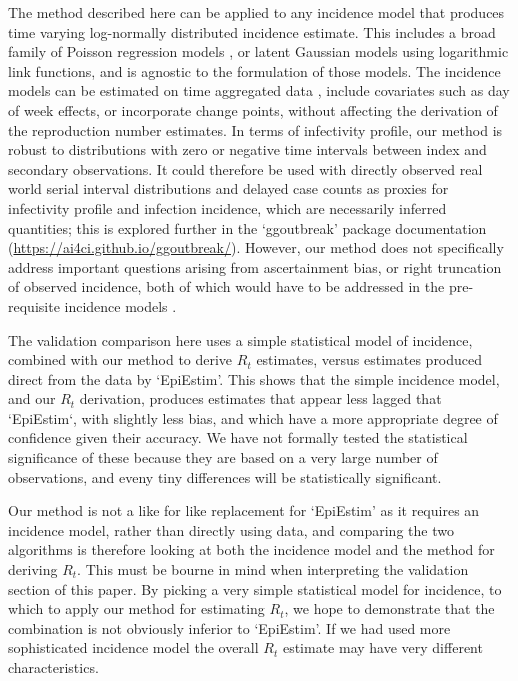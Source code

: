 \documentclass[10pt,letterpaper]{article}
\begin{document}
The method described here can be applied to any incidence model that produces time varying log-normally distributed incidence estimate. This includes a broad family of Poisson regression models \cite{nelder1972,loader1999,hastie2017}, or latent Gaussian models \cite{rue2009} using logarithmic link functions, and is agnostic to the formulation of those models. The incidence models can be estimated on time aggregated data \cite{nash2023}, include covariates such as day of week effects, or incorporate change points, without affecting the derivation of the reproduction number estimates. In terms of infectivity profile, our method is robust to distributions with zero or negative time intervals between index and secondary observations. It could therefore be used with directly observed real world serial interval distributions \cite{park2021} and delayed case counts as proxies for infectivity profile and infection incidence, which are necessarily inferred quantities; this is explored further in the `ggoutbreak' package documentation (\url{https://ai4ci.github.io/ggoutbreak/}). However, our method does not specifically address important questions arising from ascertainment bias, or right truncation of observed incidence, both of which would have to be addressed in the pre-requisite incidence models \cite{abbott2020,abbott2024}.

The validation comparison here uses a simple statistical model of incidence, combined with our method to derive $R_t$ estimates, versus estimates produced direct from the data by `EpiEstim'. This shows that the simple incidence model, and our $R_t$ derivation, produces estimates that appear less lagged that `EpiEstim`, with slightly less bias, and which have a more appropriate degree of confidence given their accuracy. We have not formally tested the statistical significance of these because they are based on a very large number of observations, and eveny tiny differences will be statistically significant.

Our method is not a like for like replacement for `EpiEstim' as it requires an incidence model, rather than directly using data, and comparing the two algorithms is therefore looking at both the incidence model and the method for deriving $R_t$. This must be bourne in mind when interpreting the validation section of this paper. By picking a very simple statistical model for incidence, to which to apply our method for estimating $R_t$, we hope to demonstrate that the combination is not obviously inferior to `EpiEstim'. If we had used more sophisticated incidence model the overall $R_t$ estimate may have very different characteristics.
\end{document}
